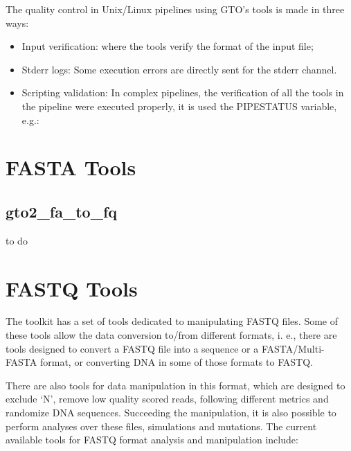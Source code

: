 \documentclass[11pt,]{krantz}
\newenvironment{Shaded}{\begin{snugshade}}{\end{snugshade}}
\newcommand{\KeywordTok}[1]{\textcolor[rgb]{0.27,0.27,0.27}{\textbf{#1}}}
\newcommand{\StringTok}[1]{\textcolor[rgb]{0.5,0.5,0.5}{#1}}
\newcommand{\VariableTok}[1]{\textcolor[rgb]{0,0,0}{#1}}
\newcommand{\OperatorTok}[1]{\textcolor[rgb]{0.43,0.43,0.43}{\textbf{#1}}}
\newcommand{\BuiltInTok}[1]{#1}
\newcommand{\ExtensionTok}[1]{#1}
\newcommand{\NormalTok}[1]{#1}
\begin{document}
The quality control in Unix/Linux pipelines using GTO's tools is made in
three ways:

\begin{itemize}
\item
  Input verification: where the tools verify the format of the input
  file;
\item
  Stderr logs: Some execution errors are directly sent for the stderr
  channel.
\item
  Scripting validation: In complex pipelines, the verification of all
  the tools in the pipeline were executed properly, it is used the
  PIPESTATUS variable, e.g.:

\begin{Shaded}
\end{Shaded}
\end{itemize}

\chapter{FASTA Tools}\label{fasta-tools}

\section{gto2\_fa\_to\_fq}\label{gto2_fa_to_fq}

to do

\chapter{FASTQ Tools}\label{fastq-tools}

The toolkit has a set of tools dedicated to manipulating FASTQ files.
Some of these tools allow the data conversion to/from different formats,
i. e., there are tools designed to convert a FASTQ file into a sequence
or a FASTA/Multi-FASTA format, or converting DNA in some of those
formats to FASTQ.

There are also tools for data manipulation in this format, which are
designed to exclude `N', remove low quality scored reads, following
different metrics and randomize DNA sequences. Succeeding the
manipulation, it is also possible to perform analyses over these files,
simulations and mutations. The current available tools for FASTQ format
analysis and manipulation include:
\end{document}
